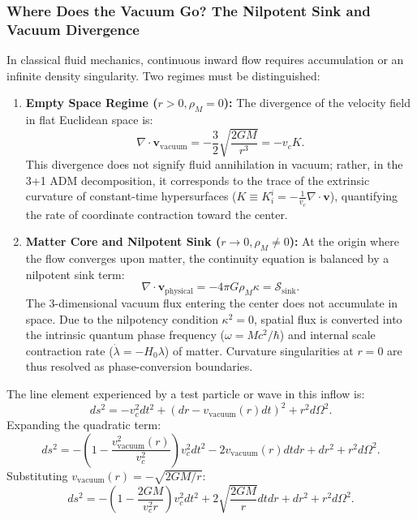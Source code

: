 \subsubsection{Where Does the Vacuum Go? The Nilpotent Sink and Vacuum Divergence}
In classical fluid mechanics, continuous inward flow requires accumulation or an infinite density singularity. Two regimes must be distinguished:
\begin{enumerate}
    \item \textbf{Empty Space Regime ($r > 0, \rho_M = 0$):} The divergence of the velocity field in flat Euclidean space is:
    \begin{equation}
        \nabla \cdot \mathbf{v}_{\mathrm{vacuum}} = -\frac{3}{2} \sqrt{\frac{2GM}{r^3}} = - v_c K.
        \label{eq:extrinsic_curvature_trace}
    \end{equation}
    This divergence does not signify fluid annihilation in vacuum; rather, in the 3+1 ADM decomposition, it corresponds to the trace of the extrinsic curvature of constant-time hypersurfaces ($K \equiv K^i_i = -\frac{1}{v_c}\nabla\cdot\mathbf{v}$), quantifying the rate of coordinate contraction toward the center.
    \item \textbf{Matter Core and Nilpotent Sink ($r \to 0, \rho_M \neq 0$):} At the origin where the flow converges upon matter, the continuity equation is balanced by a nilpotent sink term:
    \begin{equation}
        \nabla \cdot \mathbf{v}_{\mathrm{physical}} = -4\pi G \rho_M \kappa = \mathcal{S}_{\mathrm{sink}}.
        \label{eq:sureklilik_main}
    \end{equation}
    The 3-dimensional vacuum flux entering the center does not accumulate in space. Due to the nilpotency condition $\kappa^2 = 0$, spatial flux is converted into the intrinsic quantum phase frequency ($\omega = M c^2 / \hbar$) and internal scale contraction rate ($\dot{\lambda} = -H_0 \lambda$) of matter. Curvature singularities at $r=0$ are thus resolved as phase-conversion boundaries.
\end{enumerate}

The line element experienced by a test particle or wave in this inflow is:
\begin{equation}
    ds^2 = -v_c^2 dt^2 + \left( dr - v_{\mathrm{vacuum}}(r) dt \right)^2 + r^2 d\Omega^2.
    \label{eq:bizim_vakum_metrigi}
\end{equation}
Expanding the quadratic term:
\begin{equation}
    ds^2 = -\left(1 - \frac{v_{\mathrm{vacuum}}^2(r)}{v_c^2}\right) v_c^2 dt^2 - 2 v_{\mathrm{vacuum}}(r) dt dr + dr^2 + r^2 d\Omega^2.
    \label{eq:vakum_metrik_acik}
\end{equation}
Substituting $v_{\mathrm{vacuum}}(r) = -\sqrt{2GM/r}$:
\begin{equation}
    ds^2 = -\left(1 - \frac{2GM}{v_c^2 r}\right) v_c^2 dt^2 + 2\sqrt{\frac{2GM}{r}} dt dr + dr^2 + r^2 d\Omega^2.
    \label{eq:bizim_yercekimi_tam}
\end{equation}

